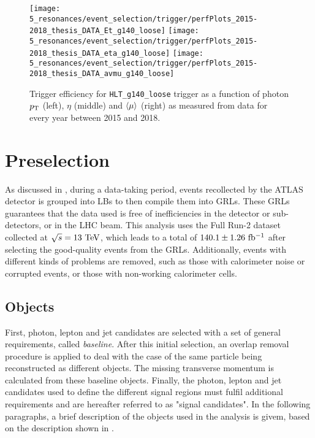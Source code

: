 \begin{figure}[ht!]
    \centering
    \texttt{[image: 5\_resonances/event\_selection/trigger/perfPlots\_2015-2018\_thesis\_DATA\_Et\_g140\_loose]}
    \texttt{[image: 5\_resonances/event\_selection/trigger/perfPlots\_2015-2018\_thesis\_DATA\_eta\_g140\_loose]}
    \texttt{[image: 5\_resonances/event\_selection/trigger/perfPlots\_2015-2018\_thesis\_DATA\_avmu\_g140\_loose]}
    \caption{Trigger efficiency for \texttt{HLT\_g140\_loose} trigger as a function of photon \(\pt\) (left), \(\eta\) (middle) and \(\avgmu\) (right) as measured from data for every year between 2015 and 2018.}
    \label{fig:evt_selection:trigger:trigger_perf_15_18}
\end{figure}








\section{Preselection}
\label{sec:evt_selection:presel}



As discussed in \Sect{\ref{sec:atlas:runs}}, during a data-taking period, events recollected by the \ac{ATLAS} detector is grouped into \acp{LB} to then compile them into \acp{GRL}. These \acp{GRL} guarantees that the data used is free of inefficiencies in the detector or sub-detectors, or in the \ac{LHC} beam. This analysis uses the Full Run-2 dataset collected at \(\sqs = 13~\tev\), which leads to a total of \(140.1 \pm 1.26~\ifb\) after selecting the good-quality events from the \acp{GRL}. Additionally, events with different kinds of problems are removed, such as those with calorimeter noise or corrupted events, or those with non-working calorimeter cells.





\subsection{Objects}
\label{subsec:evt_selection:presel:objs}

First, photon, lepton and jet candidates are selected with a set of general requirements, called \textit{baseline}. After this initial selection, an overlap removal procedure is applied to deal with the case of the same particle being reconstructed as different objects. The missing transverse momentum is calculated from these baseline objects. Finally, the photon, lepton and jet candidates used to define the different signal regions must fulfil additional requirements and are hereafter referred to as "signal candidates". In the following paragraphs, a brief description of the objects used in the analysis is givem, based on the description shown in \Ch{\ref{ch:objects}}.


